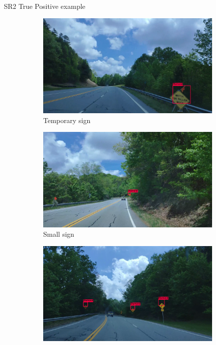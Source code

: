 \documentclass{beamer}
\begin{document}
\begin{frame}{SR2 True Positive example}
    \begin{figure}
      \begin{center}
        \begin{subfigure}[t]{.49\linewidth}
          \centering
          \includegraphics[width=0.99\linewidth]{figures/examples/sr2/TP/TP_01.png}
          \caption{Temporary sign}
          \label{fig:temporaryTP}
        \end{subfigure}
        \begin{subfigure}[t]{.49\linewidth}
          \centering
          \includegraphics[width=0.99\linewidth]{figures/examples/sr2/TP/TP_09.png}
          \caption{Small sign}
          \label{fig:farobstTP}
        \end{subfigure}
        \begin{subfigure}[t]{.49\linewidth}
          \centering
          \includegraphics[width=0.99\linewidth]{figures/examples/sr2/TP/TP_05.png}

\end{subfigure}
\end{center}
\end{figure}
\end{frame}
\end{document}
